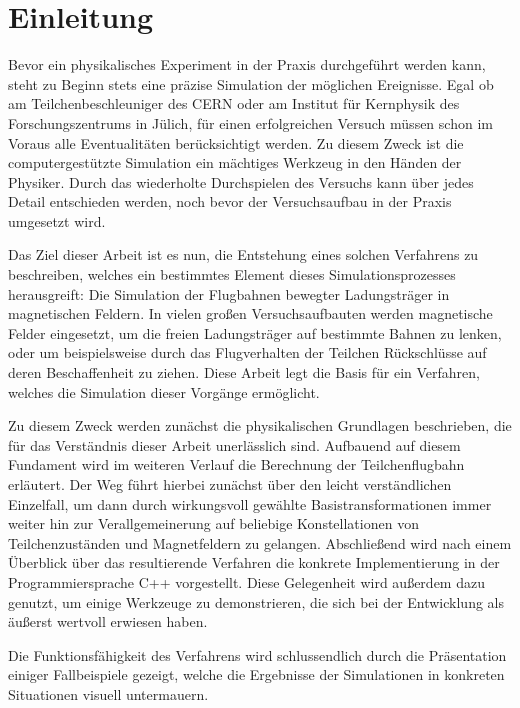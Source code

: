 \chapter{Einleitung}

Bevor ein physikalisches Experiment in der Praxis durchgef\"uhrt werden kann, steht zu Beginn stets eine
pr\"azise Simulation der m\"oglichen Ereignisse. Egal ob am Teilchenbeschleuniger des CERN oder am
Institut f\"ur Kernphysik des Forschungszentrums in J\"ulich, f\"ur einen erfolgreichen Versuch
m\"ussen schon im Voraus alle Eventualit\"aten ber\"ucksichtigt werden. Zu diesem Zweck ist die
computergest\"utzte Simulation ein m\"achtiges Werkzeug in den H\"anden der Physiker. Durch das
wiederholte Durchspielen des Versuchs kann \"uber jedes Detail entschieden werden, noch bevor der
Versuchsaufbau in der Praxis umgesetzt wird.

Das Ziel dieser Arbeit ist es nun, die Entstehung eines
solchen Verfahrens zu beschreiben, welches ein bestimmtes Element dieses Simulationsprozesses
herausgreift: Die Simulation der Flugbahnen bewegter Ladungstr\"ager in magnetischen Feldern.
In vielen gro{\ss}en Versuchsaufbauten werden magnetische
Felder eingesetzt, um die freien Ladungstr\"ager auf bestimmte Bahnen zu lenken, oder um
beispielsweise durch das Flugverhalten der Teilchen R\"uckschl\"usse auf deren Beschaffenheit zu
ziehen. Diese Arbeit legt die Basis f\"ur ein Verfahren, welches die Simulation dieser Vorg\"ange
erm\"oglicht.

Zu diesem Zweck werden zun\"achst die physikalischen Grundlagen beschrieben, die f\"ur das
Verst\"andnis dieser Arbeit unerl\"asslich sind. Aufbauend auf diesem Fundament wird im weiteren
Verlauf die Berechnung der Teilchenflugbahn erl\"autert. Der Weg f\"uhrt hierbei zun\"achst \"uber
den leicht verst\"andlichen Einzelfall, um dann durch wirkungsvoll gew\"ahlte Basistransformationen immer weiter
hin zur Verallgemeinerung auf beliebige Konstellationen von Teilchenzust\"anden und Magnetfeldern zu
gelangen. Abschlie{\ss}end wird nach einem \"Uberblick \"uber das resultierende Verfahren die
konkrete Implementierung in der Programmiersprache C++ vorgestellt. Diese Gelegenheit wird
au{\ss}erdem dazu genutzt, um einige Werkzeuge zu demonstrieren, die sich bei der Entwicklung als
\"au{\ss}erst wertvoll erwiesen haben.

Die Funktionsf\"ahigkeit des Verfahrens wird schlussendlich
durch die Pr\"asentation einiger Fallbeispiele gezeigt, welche die Ergebnisse der Simulationen in
konkreten Situationen visuell untermauern.
